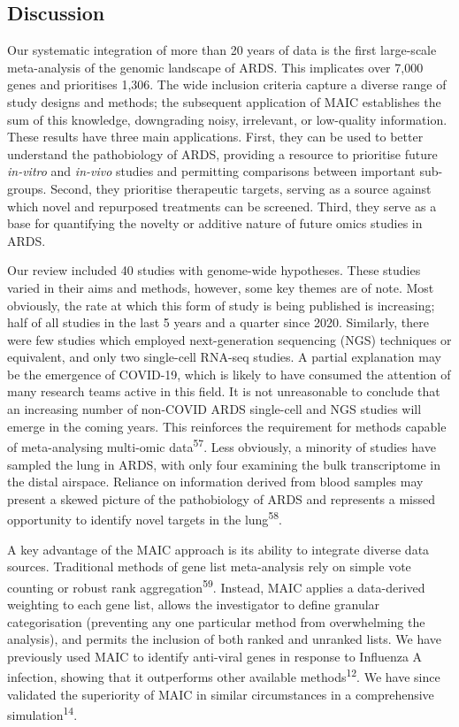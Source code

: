 \documentclass[
  11,
  a4paper,
]{article}
\begin{document}
\newpage

\hypertarget{discussion}{%
\subsection{Discussion}\label{discussion}}

Our systematic integration of more than 20 years of data is the first
large-scale meta-analysis of the genomic landscape of ARDS. This
implicates over 7,000 genes and prioritises 1,306. The wide inclusion
criteria capture a diverse range of study designs and methods; the
subsequent application of MAIC establishes the sum of this knowledge,
downgrading noisy, irrelevant, or low-quality information. These results
have three main applications. First, they can be used to better
understand the pathobiology of ARDS, providing a resource to prioritise
future \emph{in-vitro} and \emph{in-vivo} studies and permitting
comparisons between important sub-groups. Second, they prioritise
therapeutic targets, serving as a source against which novel and
repurposed treatments can be screened. Third, they serve as a base for
quantifying the novelty or additive nature of future omics studies in
ARDS.

Our review included 40 studies with genome-wide hypotheses. These
studies varied in their aims and methods, however, some key themes are
of note. Most obviously, the rate at which this form of study is being
published is increasing; half of all studies in the last 5 years and a
quarter since 2020. Similarly, there were few studies which employed
next-generation sequencing (NGS) techniques or equivalent, and only two
single-cell RNA-seq studies. A partial explanation may be the emergence
of COVID-19, which is likely to have consumed the attention of many
research teams active in this field. It is not unreasonable to conclude
that an increasing number of non-COVID ARDS single-cell and NGS studies
will emerge in the coming years. This reinforces the requirement for
methods capable of meta-analysing multi-omic data\textsuperscript{57}.
Less obviously, a minority of studies have sampled the lung in ARDS,
with only four examining the bulk transcriptome in the distal airspace.
Reliance on information derived from blood samples may present a skewed
picture of the pathobiology of ARDS and represents a missed opportunity
to identify novel targets in the lung\textsuperscript{58}.

A key advantage of the MAIC approach is its ability to integrate diverse
data sources. Traditional methods of gene list meta-analysis rely on
simple vote counting or robust rank aggregation\textsuperscript{59}.
Instead, MAIC applies a data-derived weighting to each gene list, allows
the investigator to define granular categorisation (preventing any one
particular method from overwhelming the analysis), and permits the
inclusion of both ranked and unranked lists. We have previously used
MAIC to identify anti-viral genes in response to Influenza A infection,
showing that it outperforms other available methods\textsuperscript{12}.
We have since validated the superiority of MAIC in similar circumstances
in a comprehensive simulation\textsuperscript{14}.
\end{document}
